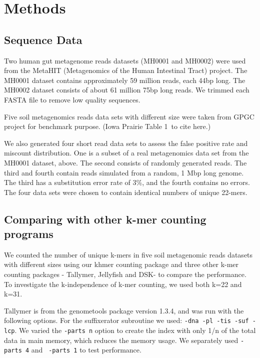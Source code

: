 \documentclass{article}
\begin{document}
\section{Methods}

\subsection{Sequence Data}

Two human gut metagenome reads datasets (MH0001 and MH0002) were used from the 
MetaHIT (Metagenomics of the Human Intestinal Tract) project\cite{Qin2010}. 
The MH0001 dataset contains approximately 59 million reads, each 44bp long. 
The MH0002 dataset consists of about 61 million 75bp long reads.
We trimmed each FASTA file to remove low quality sequences. 

Five soil metagenomics reads data sets with different size were taken
from GPGC project for benchmark purpose.
(Iowa Prairie Table 1\ to cite here.)

We also generated four short read data sets to assess the false
positive rate and miscount distribution. One is a subset of a real
metagenomics data set from the MH0001 dataset, above. The second consists of randomly generated reads. The third
and fourth contain reads simulated from a random, 1 Mbp long genome.
The third has a substitution error rate of 3\%, and the fourth contains
no errors. The four data sets were chosen to contain identical numbers
of unique 22-mers.

\subsection{Comparing with other k-mer counting programs}

We counted the number of unique k-mers in five soil metagenomic reads
datasets with different sizes using our khmer counting package and
three other k-mer counting packages - Tallymer, Jellyfish and DSK- to compare
the performance. To investigate the k-independence of k-mer counting,
we used both k=22 and k=31.

Tallymer is from the genometools package version 1.3.4, and was run
with the following options. For the suffixerator subroutine we used:
{\tt -dna -pl -tis -suf -lcp}.  We varied the {\tt -parts n} option to
create the index with only 1/n of the total data in main memory, which
reduces the memory usage.  We separately used {\tt -parts 4} and {\tt
  -parts 1} to test performance.
\end{document}

